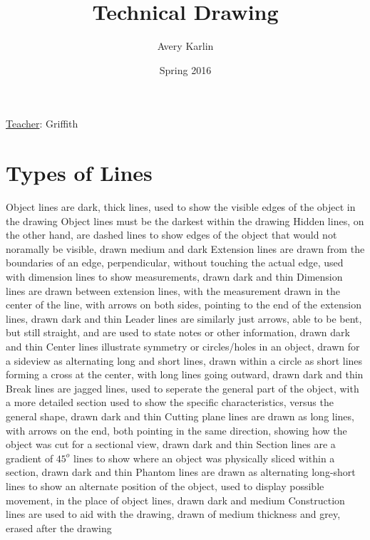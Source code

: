 \documentclass[11 pt, twoside]{article}
\newenvironment{outline*}
{
	\begin{outline}[enumerate]
	}
	{\end{outline}
}
\begin{document}
\title{Technical Drawing}
\author{Avery Karlin}
\date{Spring 2016}
\newcommand{\teacher}{Griffith}

\maketitle
\newpage
\hypertarget{content}{\tableofcontents}
\vspace{11pt}
\noindent
\underline{Teacher}: \teacher
\newpage

\section{Types of Lines}
\begin{outline*}
\1 Object lines are dark, thick lines, used to show the visible edges of the object in the drawing
\2 Object lines must be the darkest within the drawing
\2 Hidden lines, on the other hand, are dashed lines to show edges of the object that would not noramally be visible, drawn medium and dark
\1 Extension lines are drawn from the boundaries of an edge, perpendicular, without touching the actual edge, used with dimension lines to show measurements, drawn dark and thin
\2 Dimension lines are drawn between extension lines, with the measurement drawn in the center of the line, with arrows on both sides, pointing to the end of the extension lines, drawn dark and thin
\2 Leader lines are similarly just arrows, able to be bent, but still straight, and are used to state notes or other information, drawn dark and thin
\1 Center lines illustrate symmetry or circles/holes in an object, drawn for a sideview as alternating long and short lines, drawn within a circle as short lines forming a cross at the center, with long lines going outward, drawn dark and thin
\2 Break lines are jagged lines, used to seperate the general part of the object, with a more detailed section used to show the specific characteristics, versus the general shape, drawn dark and thin
\2 Cutting plane lines are drawn as long lines, with arrows on the end, both pointing in the same direction, showing how the object was cut for a sectional view, drawn dark and thin
\2 Section lines are a gradient of $45^o$ lines to show where an object was physically sliced within a section, drawn dark and thin
\1 Phantom lines are drawn as alternating long-short lines to show an alternate position of the object, used to display possible movement, in the place of object lines, drawn dark and medium
\1 Construction lines are used to aid with the drawing, drawn of medium thickness and grey, erased after the drawing
\end{outline*}
\end{document}
